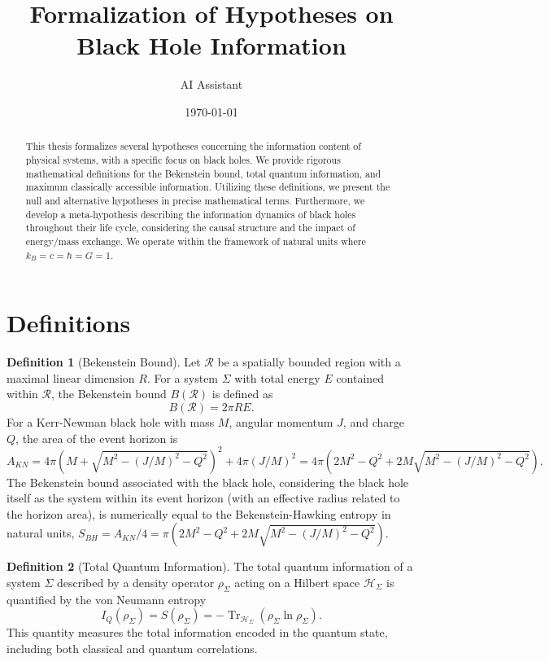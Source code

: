 \documentclass{article}
\title{Formalization of Hypotheses on Black Hole Information}
\author{AI Assistant}
\date{\today}
\theoremstyle{definition}
\newtheorem{definition}{Definition}[section]
\begin{document}
	
	\maketitle
	
	\begin{abstract}
		This thesis formalizes several hypotheses concerning the information content of physical systems, with a specific focus on black holes. We provide rigorous mathematical definitions for the Bekenstein bound, total quantum information, and maximum classically accessible information. Utilizing these definitions, we present the null and alternative hypotheses in precise mathematical terms. Furthermore, we develop a meta-hypothesis describing the information dynamics of black holes throughout their life cycle, considering the causal structure and the impact of energy/mass exchange. We operate within the framework of natural units where $k_B = c = \hbar = G = 1$.
	\end{abstract}
	
	\section{Definitions}
	
	\begin{definition}[Bekenstein Bound]
		Let $\mathcal{R}$ be a spatially bounded region with a maximal linear dimension $R$. For a system $\Sigma$ with total energy $E$ contained within $\mathcal{R}$, the Bekenstein bound $B(\mathcal{R})$ is defined as
		$$B(\mathcal{R}) = 2 \pi R E.$$
		For a Kerr-Newman black hole with mass $M$, angular momentum $J$, and charge $Q$, the area of the event horizon is
		$$A_{KN} = 4 \pi \left( M + \sqrt{M^2 - (J/M)^2 - Q^2} \right)^2 + 4 \pi (J/M)^2 = 4 \pi \left( 2 M^2 - Q^2 + 2 M \sqrt{M^2 - (J/M)^2 - Q^2} \right).$$
		The Bekenstein bound associated with the black hole, considering the black hole itself as the system within its event horizon (with an effective radius related to the horizon area), is numerically equal to the Bekenstein-Hawking entropy in natural units, $S_{BH} = A_{KN} / 4 = \pi \left( 2 M^2 - Q^2 + 2 M \sqrt{M^2 - (J/M)^2 - Q^2} \right)$.
	\end{definition}
	
	\begin{definition}[Total Quantum Information]
		The total quantum information of a system $\Sigma$ described by a density operator $\rho_\Sigma$ acting on a Hilbert space $\mathcal{H}_\Sigma$ is quantified by the von Neumann entropy
		$$I_Q(\rho_\Sigma) = S(\rho_\Sigma) = - \operatorname{Tr}_{\mathcal{H}_\Sigma}(\rho_\Sigma \ln \rho_\Sigma).$$
		This quantity measures the total information encoded in the quantum state, including both classical and quantum correlations.
	\end{definition}
	
\end{document}
